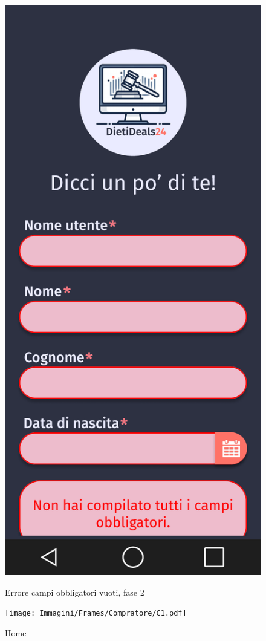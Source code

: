\begin{figure}[!htb]
\begin{minipage}{0.32\textwidth}
            \includegraphics[width=.7\linewidth]{Immagini/Frames/Errori/E8.pdf}
            \caption{Errore campi obbligatori vuoti, fase 2}
        \end{minipage}\hfill
        \begin{minipage}{0.32\textwidth}
            \centering
            \texttt{[image: Immagini/Frames/Compratore/C1.pdf]}
            \caption{Home}
        \end{minipage}\hfill
    \end{figure}

